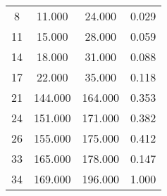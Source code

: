 % 
\begin{tabular}{cccc}
  \hline
  \hline
8 & 11.000 & 24.000 & 0.029 \\ 
  11 & 15.000 & 28.000 & 0.059 \\ 
  14 & 18.000 & 31.000 & 0.088 \\ 
  17 & 22.000 & 35.000 & 0.118 \\ 
  21 & 144.000 & 164.000 & 0.353 \\ 
  24 & 151.000 & 171.000 & 0.382 \\ 
  26 & 155.000 & 175.000 & 0.412 \\ 
  33 & 165.000 & 178.000 & 0.147 \\ 
  34 & 169.000 & 196.000 & 1.000 \\ 
   \hline
\end{tabular}
